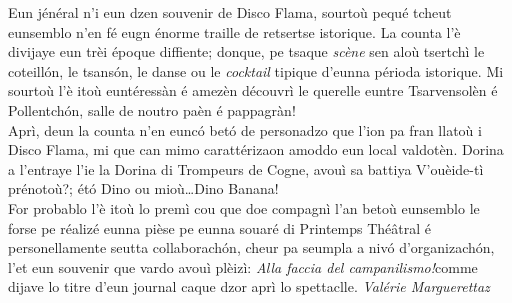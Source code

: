 \newline
\newline
\og Eun jénéral n'i eun dzen souvenir de Disco Flama, sourtoù pequé tcheut eunsemblo n'en fé eugn énorme traille de retsertse i\-storique. La counta l'è divijaye eun trèi époque diffiente; donque, pe tsaque \textit{scène} sen aloù tsertchì le coteill\'on, le tsans\'on, le danse ou le \textit{cocktail} tipique d'eunna périoda  istorique. Mi sourtoù l'è itoù euntéressàn é amezèn découvrì le querelle euntre Tsarvensolèn é Pollentch\'on, salle de noutro paèn é pappagràn!
\\ Aprì, deun la counta n'en eunc\'o bet\'o de personadzo que l'ion pa fran llatoù i Disco Flama, mi que can mimo carattérizaon amoddo eun local valdotèn. Dorina a l'entraye l'ie la Dorina di Trompeurs de Cogne, avouì sa battiya \og V'ouèide-tì prénotoù?\fg; ét\'o Dino ou mioù\ldots Dino Banana!
\\ For probablo l'è itoù lo premì cou que doe compagnì l'an betoù eunsemblo le forse pe réalizé eunna pièse pe eunna souaré di Printemps Thé\^atral é personellamente seutta collaborach\'on, cheur pa seumpla a niv\'o d'organizach\'on, l'et eun souvenir que vardo avouì plèizì: \og\textit{Alla faccia del campanilismo!}\fg comme dijave lo titre d'eun journal caque dzor aprì lo spettaclle.\fg{}
\newline
\newline
\hspace*{\fill} \textit{Valérie Marguerettaz}
